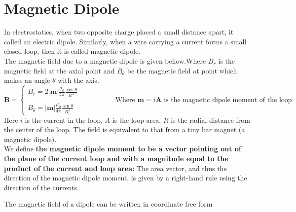 \section{Magnetic Dipole}
In electrostatics, when two opposite charge placed a small distance apart, it called an electric dipole. Similarly, when a wire carrying a current forms a small closed loop, then it is called magnetic dipole.\\
The magnetic field due to a magnetic dipole is given bellow.Where $B_r$ is the magnetic field at the axial point and $B_{\theta}$ be the magnetic field at point which makes an angle $\theta$ with the axis.
$$\mathbf{B}=\left\{\begin{array}{l}
	B_{r}=2|\boldsymbol{m}| \frac{\mu_{0}}{4 \pi} \frac{\cos \theta}{R^{3}} \\\\
	B_{\theta}=|\boldsymbol{m}| \frac{\mu_{0}}{4 \pi} \frac{\sin \theta}{R^{3}}
\end{array}\right.\hspace{2cm}\text { Where } \boldsymbol{m}=i \mathbf{A} \text { is the magnetic dipole moment of the loop }$$
Here $i$ is the current in the loop, $A$ is the loop area, $R$ is the radial distance from the center of the loop. The field is equivalent to that from a tiny bar magnet (a magnetic dipole).\\
We define \textbf{the magnetic dipole moment to be a vector pointing out of the plane of the current loop and with a magnitude equal to the product of the current and loop area:}
The area vector, and thus the direction of the magnetic dipole moment, is given by a right-hand rule using the direction of the currents.
\begin{center}
\end{center}
\begin{note}
	The magnetic field of a dipole can be written in coordinate free form\\
\begin{center}
\end{center}
\end{note}
